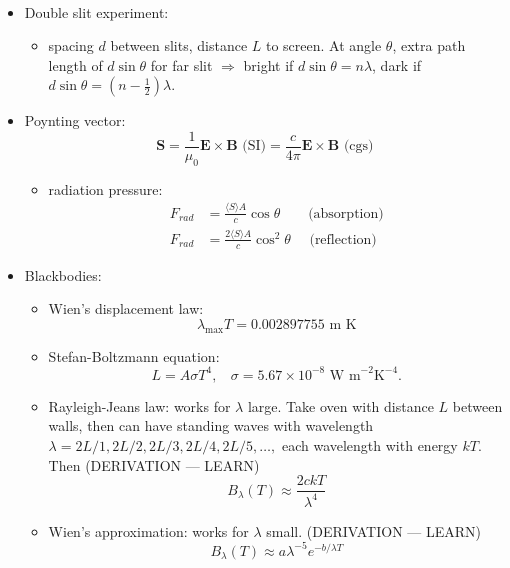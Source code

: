 \documentclass[12pt]{article}
\begin{document}
\begin{itemize}
\begin{itemize}
\begin{align*}
\end{align*}
\end{itemize}
\item Double slit experiment:
\begin{itemize}
\item spacing $d$ between slits, distance $L$ to screen. At angle $\theta$, extra path length of $d\sin\theta$ for far slit $\Longrightarrow$ bright if $d\sin\theta = n\lambda$, dark if $d\sin\theta = (n - \frac{1}{2})\lambda$.
\end{itemize}
\item Poynting vector:
\begin{equation}
\bm{S} = \frac{1}{\mu_0}\bm{E}\times\bm{B}\text{ (SI)} = \frac{c}{4\pi}\bm{E}\times\bm{B}\text{ (cgs)}
\end{equation}
\begin{itemize}
\item radiation pressure:
\begin{align*}
F_{rad} &= \frac{\langle S\rangle A}{c}\cos\theta~~~~~~~~~\text{(absorption)}\\
F_{rad} &= \frac{2\langle S\rangle A}{c}\cos^2\theta~~~~~~\text{(reflection)}
\end{align*}
\end{itemize}
\item Blackbodies:
\begin{itemize}
\item Wien's displacement law:
\begin{equation}
\lambda_\text{max} T = 0.002897755\text{ m K}
\end{equation}
\item Stefan-Boltzmann equation:
\begin{equation}
L = A\sigma T^4,~~~~\sigma = 5.67\times 10^{-8}\text{ W m}^{-2}\text{K}^{-4}.
\end{equation}
\item Rayleigh-Jeans law: works for $\lambda$ large. Take oven with distance $L$ between walls, then can have standing waves with wavelength $\lambda = 2L/1, 2L/2, 2L/3, 2L/4, 2L/5, \dots,$ each wavelength with energy $kT$. Then (DERIVATION --- LEARN)
\begin{equation}
B_\lambda(T)\approx\frac{2ckT}{\lambda^4}
\end{equation}
\item Wien's approximation: works for $\lambda$ small. (DERIVATION --- LEARN)
\begin{equation}
B_\lambda(T) \approx a \lambda^{-5} e^{-b/\lambda T}
\end{equation}

\end{itemize}
\end{itemize}
\end{document}
